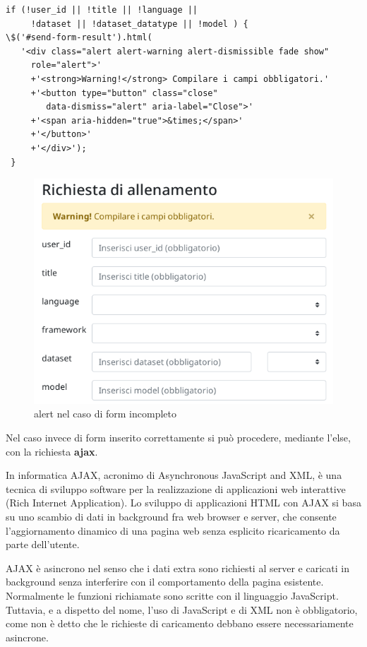 \documentclass[a4paper,12pt, oneside]{book}
\begin{document}
\begin{shaded}
\begin{verbatim}
if (!user_id || !title || !language ||
     !dataset || !dataset_datatype || !model ) { 
\$('#send-form-result').html(
   '<div class="alert alert-warning alert-dismissible fade show"
     role="alert">'
     +'<strong>Warning!</strong> Compilare i campi obbligatori.'
     +'<button type="button" class="close"
        data-dismiss="alert" aria-label="Close">'
     +'<span aria-hidden="true">&times;</span>'
     +'</button>'
     +'</div>');
 }
\end{verbatim}
\end{shaded}
\begin{figure}[H]
  \centering
  \includegraphics[scale = 0.7]{img/err-form.png}
  \caption{alert nel caso di form incompleto}
\end{figure}
Nel caso invece di form inserito correttamente si può procedere, mediante l'else, con la richiesta \textbf{ajax}.\\
\begin{shaded}
In informatica AJAX, acronimo di Asynchronous JavaScript and XML, è una tecnica di sviluppo software per la realizzazione di applicazioni web interattive (Rich Internet Application). Lo sviluppo di applicazioni HTML con AJAX si basa su uno scambio di dati in background fra web browser e server, che consente l'aggiornamento dinamico di una pagina web senza esplicito ricaricamento da parte dell'utente.

AJAX è asincrono nel senso che i dati extra sono richiesti al server e caricati in background senza interferire con il comportamento della pagina esistente. Normalmente le funzioni richiamate sono scritte con il linguaggio JavaScript. Tuttavia, e a dispetto del nome, l'uso di JavaScript e di XML non è obbligatorio, come non è detto che le richieste di caricamento debbano essere necessariamente asincrone. 
\end{shaded}
\end{document}
